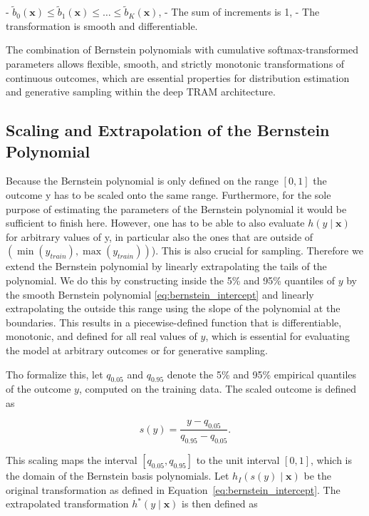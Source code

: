 - \( \tilde{b}_0(\mathbf{x}) \leq \tilde{b}_1(\mathbf{x}) \leq \ldots \leq \tilde{b}_K(\mathbf{x}) \),
- The sum of increments is 1,
- The transformation is smooth and differentiable.


The combination of Bernstein polynomials with cumulative softmax-transformed parameters allows flexible, smooth, and strictly monotonic transformations of continuous outcomes, which are essential properties for distribution estimation and generative sampling within the deep TRAM architecture.

\subsection{Scaling and Extrapolation of the Bernstein Polynomial}




Because the Bernstein polynomial is only defined on the range \( [0, 1] \) the outcome y has to be scaled onto the same range. Furthermore, for the sole purpose of estimating the parameters of the Bernstein polynomial it would be sufficient to finish here. However, one has to be able to also evaluate $h(y \mid \mathbf{x})$ for arbitrary values of y, in particular also the ones that are outside of $(\min(y_{train}), \max(y_{train}))$). This is also crucial for sampling. Therefore we extend the Bernstein polynomial by linearly extrapolating the tails of the polynomial. We do this by constructing inside the 5\% and 95\% quantiles of $y$ by the smooth Bernstein polynomial \ref{eq:bernstein_intercept} and linearly extrapolating the outside this range using the slope of the polynomial at the boundaries. This results in a piecewise-defined function that is differentiable, monotonic, and defined for all real values of \( y \), which is essential for evaluating the model at arbitrary outcomes or for generative sampling.

Tho formalize this, let \( q_{0.05} \) and \( q_{0.95} \) denote the 5\% and 95\% empirical quantiles of the outcome \( y \), computed on the training data. The scaled outcome is defined as

\begin{equation}
s(y) = \frac{y - q_{0.05}}{q_{0.95} - q_{0.05}}.
\end{equation}

This scaling maps the interval \( [q_{0.05}, q_{0.95}] \) to the unit interval \( [0, 1] \), which is the domain of the Bernstein basis polynomials. Let \( h_I(s(y) \mid \mathbf{x}) \) be the original transformation as defined in Equation~\eqref{eq:bernstein_intercept}. The extrapolated transformation \( h^*(y \mid \mathbf{x}) \) is then defined as


